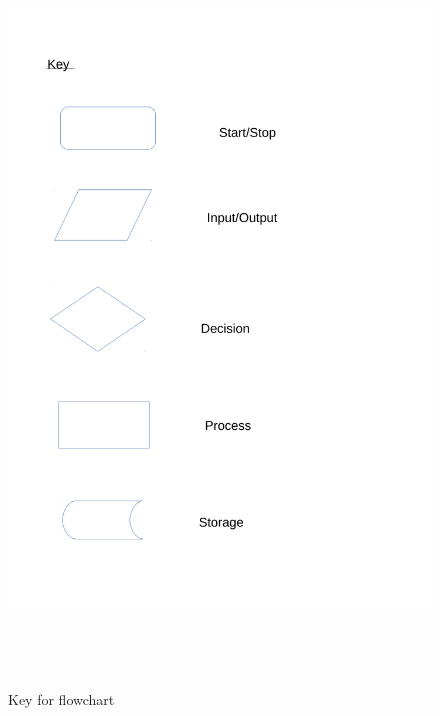 \begin{figure}[H]
    \includegraphics[height = 20cm]{./Design/Images/flowchart0}
    \caption{Key for flowchart} \label{fig:Flowchart0}
\end{figure}

